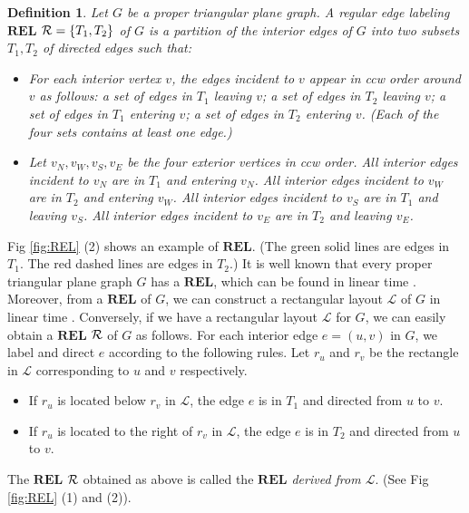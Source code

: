\documentclass[11pt]{article}
\newcommand{\R}{{\cal R}}
\newcommand{\LL}{\mathcal{L}}
\newcommand{\REL}{\mathbf{REL}}
\newtheorem{definition}[figure]{Definition}
\begin{document}
\begin{definition}\label{def:REL}
Let $G$ be a proper triangular plane graph.
A regular edge labeling $\REL$ $\R=\{T_1, T_2\}$ of
$G$ is a partition of the interior edges of $G$ into two
subsets $T_1, T_2$ of directed edges such that:

\begin{itemize}
\item For each interior vertex $v$, the edges incident to $v$
appear in ccw order around $v$ as follows: a set of
edges in $T_1$ leaving $v$; a set of edges in $T_2$ leaving $v$;
a set of edges in $T_1$ entering $v$; a set of edges in $T_2$ entering $v$.
(Each of the four sets contains at least one edge.)

\item Let $v_N, v_W, v_S, v_E$ be the four exterior vertices in
ccw order. All interior edges incident to $v_N$ are
in $T_1$ and entering $v_N$. All interior edges incident to
$v_W$ are in $T_2$ and entering $v_W$. All interior edges incident
to $v_S$ are in $T_1$ and leaving $v_S$. All interior edges
incident to $v_E$ are in $T_2$ and leaving $v_E$.
\end{itemize}
\end{definition}

Fig \ref{fig:REL} (2) shows an example of $\REL$. (The green solid
lines are edges in $T_1$. The red dashed lines are edges in $T_2$.)
It is well known that every proper triangular plane graph $G$ has a
$\REL$, which can be found in linear time \cite{He93,KH97}. Moreover,
from a $\REL$ of $G$, we can construct a rectangular layout $\LL$
of $G$ in linear time \cite{He93,KH97}. Conversely, if we have a
rectangular layout $\LL$ for $G$, we can easily obtain a $\REL$ $\R$
of $G$ as follows. For each interior edge $e=(u,v)$ in $G$, we label
and direct $e$ according to the following rules.  Let $r_u$ and $r_v$
be the rectangle in $\LL$ corresponding to $u$ and $v$ respectively.

\begin{itemize}
\item  If $r_u$ is located below $r_v$ in $\LL$, the edge $e$
is in $T_1$ and directed from $u$ to $v$.
\item   If $r_u$ is located to the right of $r_v$ in $\LL$,
the edge $e$ is in $T_2$ and directed from $u$ to $v$.
\end{itemize}

The $\REL$ $\R$ obtained as above is called the {\em $\REL$ derived from $\LL$}.
(See Fig \ref{fig:REL} (1) and (2)).
\end{document}
